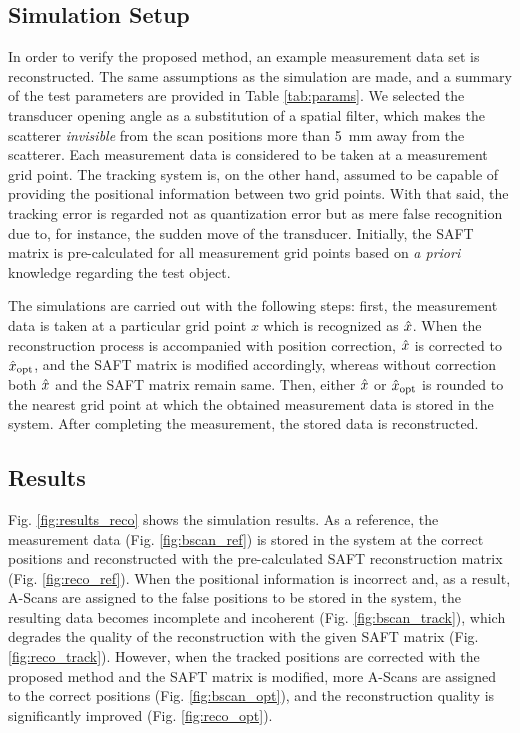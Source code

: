 \subsection{Simulation Setup}
In order to verify the proposed method, an example measurement data set is reconstructed. The same assumptions as the simulation  are made, and a summary of the test parameters are provided in Table \ref{tab:params}. We selected the transducer opening angle as a substitution of a spatial filter, which makes the scatterer \textit{invisible} from the scan positions more than \SI{5}{\milli \metre} away from the scatterer. Each measurement data is considered to be taken at a measurement grid point. The tracking system is, on the other hand, assumed to be capable of providing the positional information between two grid points. With that said, the tracking error is regarded not as quantization error but as mere false recognition due to, for instance, the sudden move of the transducer. Initially, the SAFT matrix is pre-calculated for all measurement grid points based on \textit{a priori} knowledge regarding the test object.\par
The simulations are carried out with the following steps: first, the measurement data is taken at a particular grid point $x$ which is recognized as $\hat{x}$. When the reconstruction process is accompanied with position correction, $\hat{x}$ is corrected to $\hat{x}_{\operatorname{opt}}$, and the SAFT matrix is modified accordingly, whereas without correction both $\hat{x}$ and the SAFT matrix remain same. Then, either $\hat{x}$ or $\hat{x}_{\operatorname{opt}}$ is rounded to the nearest grid point at which the obtained measurement data is stored in the system. After completing the measurement, the stored data is reconstructed. 

\subsection{Results}
Fig. \ref{fig:results_reco} shows the simulation results. As a reference, the measurement data (Fig. \ref{fig:bscan_ref}) is stored in the system at the correct positions and reconstructed with the pre-calculated SAFT reconstruction matrix (Fig. \ref{fig:reco_ref}). When the positional information is incorrect and, as a result, A-Scans are assigned to the false positions to be stored in the system, the resulting data becomes incomplete and incoherent (Fig. \ref{fig:bscan_track}), which degrades the quality of the reconstruction with the given SAFT matrix (Fig. \ref{fig:reco_track}). However, when the tracked positions are corrected with the proposed method and the SAFT matrix is modified, more A-Scans are assigned to the correct positions (Fig. \ref{fig:bscan_opt}), and the reconstruction quality is significantly improved (Fig. \ref{fig:reco_opt}). 

